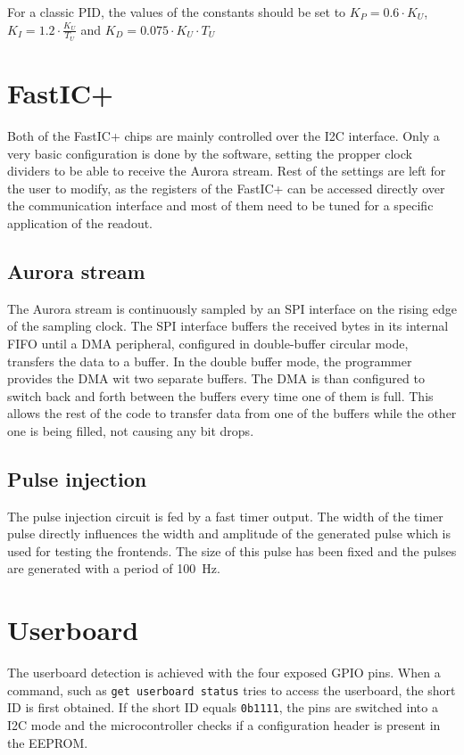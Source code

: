 For a classic PID, the values of the constants should be set to $K_P = 0.6 \cdot K_U$, $K_I = 1.2 \cdot \frac{K_U}{T_U}$ and $K_D = 0.075 \cdot K_U \cdot T_U$

\section{FastIC+}
Both of the FastIC+ chips are mainly controlled over the I2C interface. Only a very basic configuration is done by the software, setting the propper clock dividers to be able to receive the Aurora stream. Rest of the settings are left for the user to modify, as the registers of the FastIC+ can be accessed directly over the communication interface and most of them need to be tuned for a specific application of the readout.

\subsection{Aurora stream}
The Aurora stream is continuously sampled by an SPI interface on the rising edge of the sampling clock. The SPI interface buffers the received bytes in its internal FIFO until a DMA peripheral, configured in double-buffer circular mode, transfers the data to a buffer. In the double buffer mode, the programmer provides the DMA wit two separate buffers. The DMA is than configured to switch back and forth between the buffers every time one of them is full. This allows the rest of the code to transfer data from one of the buffers while the other one is being filled, not causing any bit drops. 

\subsection{Pulse injection}

The pulse injection circuit is fed by a fast timer output. The width of the timer pulse directly influences the width and amplitude of the generated pulse which is used for testing the frontends. The size of this pulse has been fixed and the pulses are generated with a period of \SI{100}{\hertz}. 
\newpage
\section{Userboard}

The userboard detection is achieved with the four exposed GPIO pins. When a command, such as \verb|get userboard status| tries to access the userboard, the short ID is first obtained. If the short ID equals \verb|0b1111|, the pins are switched into a I2C mode and the microcontroller checks if a configuration header is present in the EEPROM. 


